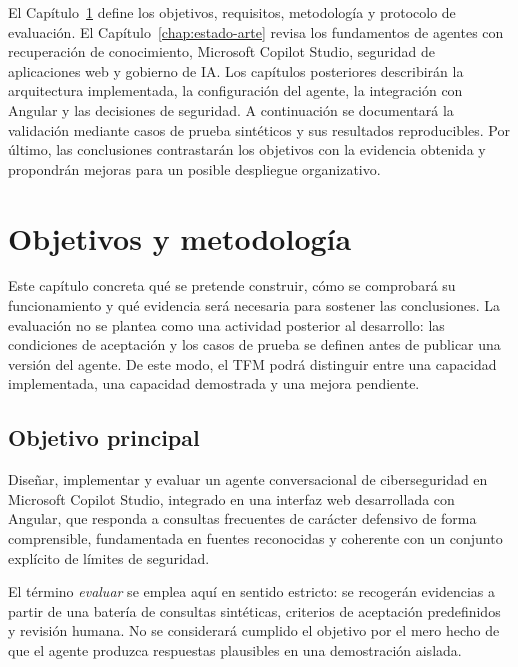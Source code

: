\documentclass[12pt,twoside,titlepage]{book}
\begin{document}
El Capítulo~\ref{chap:objetivos-metodologia} define los objetivos, requisitos,
metodología y protocolo de evaluación. El Capítulo~\ref{chap:estado-arte}
revisa los fundamentos de agentes con recuperación de conocimiento, Microsoft
Copilot Studio, seguridad de aplicaciones web y gobierno de IA. Los capítulos
posteriores describirán la arquitectura implementada, la configuración del
agente, la integración con Angular y las decisiones de seguridad. A continuación
se documentará la validación mediante casos de prueba sintéticos y sus resultados
reproducibles. Por último, las conclusiones contrastarán los objetivos con la
evidencia obtenida y propondrán mejoras para un posible despliegue organizativo.




\chapter{Objetivos y metodología}
\label{chap:objetivos-metodologia}

Este capítulo concreta qué se pretende construir, cómo se comprobará su
funcionamiento y qué evidencia será necesaria para sostener las conclusiones. La
evaluación no se plantea como una actividad posterior al desarrollo: las
condiciones de aceptación y los casos de prueba se definen antes de publicar una
versión del agente. De este modo, el TFM podrá distinguir entre una capacidad
implementada, una capacidad demostrada y una mejora pendiente.

\section{Objetivo principal}
\label{sec:objetivo-principal}

Diseñar, implementar y evaluar un agente conversacional de ciberseguridad en
Microsoft Copilot Studio, integrado en una interfaz web desarrollada con Angular,
que responda a consultas frecuentes de carácter defensivo de forma comprensible,
fundamentada en fuentes reconocidas y coherente con un conjunto explícito de
límites de seguridad.

El término \emph{evaluar} se emplea aquí en sentido estricto: se recogerán
evidencias a partir de una batería de consultas sintéticas, criterios de
aceptación predefinidos y revisión humana. No se considerará cumplido el objetivo
por el mero hecho de que el agente produzca respuestas plausibles en una
demostración aislada.
\end{document}
